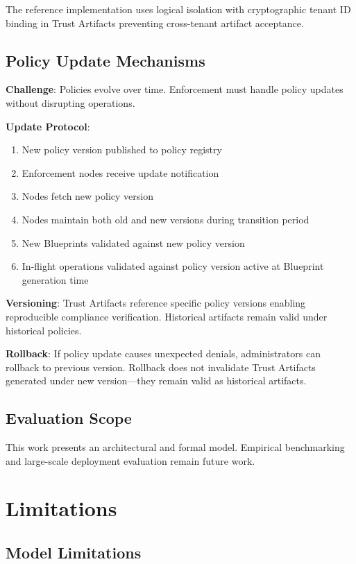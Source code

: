 \documentclass[11pt,letterpaper]{article}
\begin{document}
The reference implementation uses logical isolation with cryptographic tenant ID binding in Trust Artifacts preventing cross-tenant artifact acceptance.

\subsection{Policy Update Mechanisms}

\textbf{Challenge}: Policies evolve over time. Enforcement must handle policy updates without disrupting operations.

\textbf{Update Protocol}:
\begin{enumerate}
\item New policy version published to policy registry
\item Enforcement nodes receive update notification
\item Nodes fetch new policy version
\item Nodes maintain both old and new versions during transition period
\item New Blueprints validated against new policy version
\item In-flight operations validated against policy version active at Blueprint generation time
\end{enumerate}

\textbf{Versioning}:
Trust Artifacts reference specific policy versions enabling reproducible compliance verification. Historical artifacts remain valid under historical policies.

\textbf{Rollback}:
If policy update causes unexpected denials, administrators can rollback to previous version. Rollback does not invalidate Trust Artifacts generated under new version---they remain valid as historical artifacts.

\subsection{Evaluation Scope}

This work presents an architectural and formal model. Empirical benchmarking and large-scale deployment evaluation remain future work.

\section{Limitations}
\label{sec:limitations}

\subsection{Model Limitations}
\end{document}
